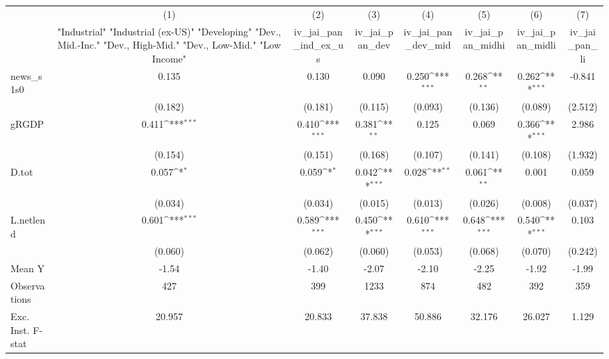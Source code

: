 {
\def\sym#1{\ifmmode^{#1}\else\(^{#1}\)\fi}
\begin{tabular}{l*{7}{c}}
\toprule
            &\multicolumn{1}{c}{(1)}&\multicolumn{1}{c}{(2)}&\multicolumn{1}{c}{(3)}&\multicolumn{1}{c}{(4)}&\multicolumn{1}{c}{(5)}&\multicolumn{1}{c}{(6)}&\multicolumn{1}{c}{(7)}\\
            &\multicolumn{1}{c}{ "Industrial" "Industrial (ex-US)" "Developing" "Dev., Mid.-Inc." "Dev., High-Mid."  "Dev., Low-Mid." "Low Income" }&\multicolumn{1}{c}{iv\_jai\_pan\_ind\_ex\_us}&\multicolumn{1}{c}{iv\_jai\_pan\_dev}&\multicolumn{1}{c}{iv\_jai\_pan\_dev\_mid}&\multicolumn{1}{c}{iv\_jai\_pan\_midhi}&\multicolumn{1}{c}{iv\_jai\_pan\_midli}&\multicolumn{1}{c}{iv\_jai\_pan\_li}\\
\midrule
news\_s1s0   &       0.135         &       0.130         &       0.090         &       0.250\sym{***}&       0.268\sym{**} &       0.262\sym{***}&      -0.841         \\
            &     (0.182)         &     (0.181)         &     (0.115)         &     (0.093)         &     (0.136)         &     (0.089)         &     (2.512)         \\
\addlinespace
gRGDP       &       0.411\sym{***}&       0.410\sym{***}&       0.381\sym{**} &       0.125         &       0.069         &       0.366\sym{***}&       2.986         \\
            &     (0.154)         &     (0.151)         &     (0.168)         &     (0.107)         &     (0.141)         &     (0.108)         &     (1.932)         \\
\addlinespace
D.tot       &       0.057\sym{*}  &       0.059\sym{*}  &       0.042\sym{***}&       0.028\sym{**} &       0.061\sym{**} &       0.001         &       0.059         \\
            &     (0.034)         &     (0.034)         &     (0.015)         &     (0.013)         &     (0.026)         &     (0.008)         &     (0.037)         \\
\addlinespace
L.netlend   &       0.601\sym{***}&       0.589\sym{***}&       0.450\sym{***}&       0.610\sym{***}&       0.648\sym{***}&       0.540\sym{***}&       0.103         \\
            &     (0.060)         &     (0.062)         &     (0.060)         &     (0.053)         &     (0.068)         &     (0.070)         &     (0.242)         \\
\midrule
Mean Y      &       -1.54         &       -1.40         &       -2.07         &       -2.10         &       -2.25         &       -1.92         &       -1.99         \\
Observations&         427         &         399         &        1233         &         874         &         482         &         392         &         359         \\
Exc. Inst. F-stat&      20.957         &      20.833         &      37.838         &      50.886         &      32.176         &      26.027         &       1.129         \\
\bottomrule
\end{tabular}
}
